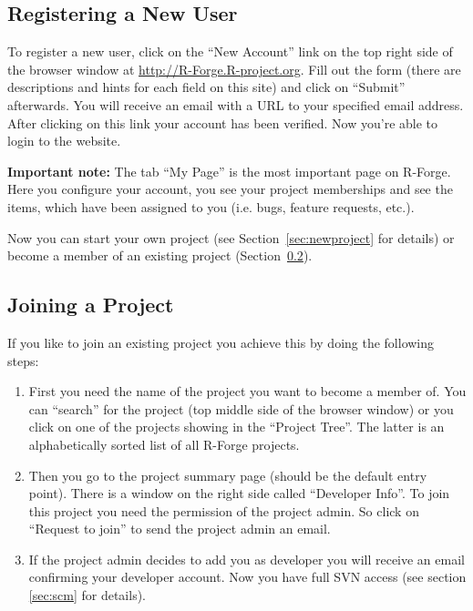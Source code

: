 \documentclass[a4paper]{article}
\newcommand{\proglang}[1]{\textsf{#1}}
\begin{document}
\subsection{Registering a  New User}

To register a new user, click on the ``New Account'' link on the top
right side of the browser window at \url{http://R-Forge.R-project.org}.
Fill out the form (there are descriptions and hints for each field on
this site) and click on ``Submit'' afterwards. You will receive an
email with
a URL to your specified email address. After clicking on this link
your account has been verified. Now you're able to login to the
website.
\newline

\textbf{Important note:} The tab ``My Page'' is the most important
page on R-Forge. Here you configure your account, you see your
project memberships and see the items, which have been assigned to you
(i.e. bugs, feature requests, etc.).
\newline

Now you can start your own project (see Section~\ref{sec:newproject}
for details) or become a member of an existing project
(Section~\ref{sec:joinproject}). 

\subsection{Joining a Project}
\label{sec:joinproject}
If you like to join an existing project you achieve this by doing the
following steps:
\begin{enumerate}
\item First you need the name of the project you want to become a
  member of. You can ``search'' for the project (top middle side of the
  browser window) or you click on one of the projects showing in the
  ``Project Tree''. The latter is an alphabetically sorted list of all
  \proglang{R}-Forge projects.
\item Then you go to the project summary page (should be the default
  entry point). There is a window on the right side called
  ``Developer Info''. To join this project you need the permission of
  the project admin. So click on ``Request to join'' to send the
  project admin an email.
\item If the project admin decides to add you as developer you will
  receive an email confirming your developer account. Now you have
  full SVN access (see section \ref{sec:scm} for details).
\end{enumerate}
\end{document}
